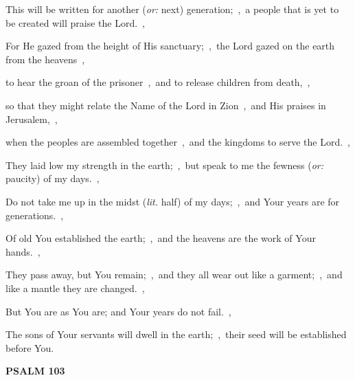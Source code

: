 \documentclass[12pt,twoside,a5paper]{article}
\newcommand{\psalm}[1]{\textbf{PSALM {#1}}\nopagebreak}
\newcommand{\translationoption}[1]{\emph{or:} #1}
\newcommand{\translationliteral}[1]{\emph{lit.} #1}
\begin{document}
\begin{normalparskip}
  This will be written for another (\translationoption{next}) generation;~\sep\ a people that is yet to be created will praise the Lord.~\sep

  For He gazed from the height of His sanctuary;~\sep\ the Lord gazed on the earth from the heavens~\sep

  to hear the groan of the prisoner~\sep\ and to release children from death,~\sep

  so that they might relate the Name of the Lord in Zion~\sep\ and His praises in Jerusalem,~\sep

  when the peoples are assembled together~\sep\ and the kingdoms to serve the Lord.~\sep

  They laid low my strength in the earth;~\sep\ but speak to me the fewness (\translationoption{paucity}) of my days.~\sep

  Do not take me up in the midst (\translationliteral{half}) of my days;~\sep\ and Your years are for generations.~\sep

  Of old You established the earth;~\sep\ and the heavens are the work of Your hands.~\sep

  They pass away, but You remain;~\sep\ and they all wear out like a garment;~\sep\ and like a mantle they are changed.~\sep

  But You are as You are; and Your years do not fail.~\sep

  The sons of Your servants will dwell in the earth;~\sep\ their seed will be established before You.
\end{normalparskip}

\psalm{103}
\end{document}
